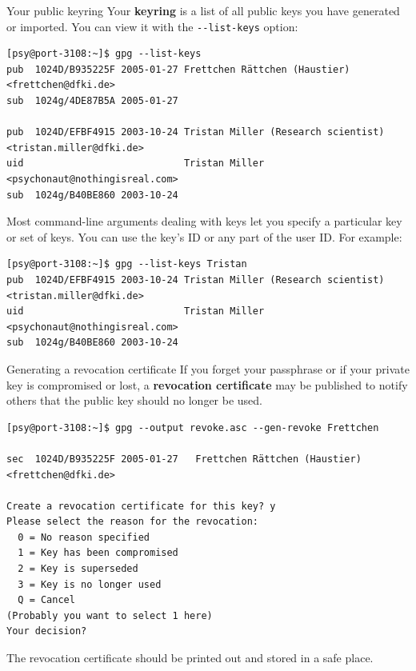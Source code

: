\documentclass[%
mode=present,%
paper=smartboard,
size=20pt,
]{powerdot}
\newcommand{\clopt}[1]{\texttt{{-}#1}}
\begin{document}
\makeatletter\renewcommand{\verbatim@font}{\tiny\tt}\makeatother
\begin{slide}[method=direct]{Your public keyring}
  Your \textbf{keyring} is a list of all public keys you have
  generated or imported.  You can view it with the
  \clopt{-list-keys} option:\\[1ex]
\begin{verbatim}
[psy@port-3108:~]$ gpg --list-keys
pub  1024D/B935225F 2005-01-27 Frettchen Rättchen (Haustier) <frettchen@dfki.de>
sub  1024g/4DE87B5A 2005-01-27

pub  1024D/EFBF4915 2003-10-24 Tristan Miller (Research scientist) <tristan.miller@dfki.de>
uid                            Tristan Miller <psychonaut@nothingisreal.com>
sub  1024g/B40BE860 2003-10-24

\end{verbatim}%
  Most command-line arguments dealing with keys let you specify a
  particular key or set of keys.  You can use the key's ID or any part
  of the user ID.  For example:\\[1ex]
\begin{verbatim}
[psy@port-3108:~]$ gpg --list-keys Tristan
pub  1024D/EFBF4915 2003-10-24 Tristan Miller (Research scientist) <tristan.miller@dfki.de>
uid                            Tristan Miller <psychonaut@nothingisreal.com>
sub  1024g/B40BE860 2003-10-24

\end{verbatim}%
\end{slide}

\makeatletter\renewcommand{\verbatim@font}{\tiny\tt}\makeatother
\begin{slide}[method=direct]{Generating a revocation certificate}
  If you forget your passphrase or if your private key is compromised
  or lost, a \textbf{revocation certificate} may be published to
  notify others that the public key should no longer be used.\\[1ex]
\begin{verbatim}
[psy@port-3108:~]$ gpg --output revoke.asc --gen-revoke Frettchen

sec  1024D/B935225F 2005-01-27   Frettchen Rättchen (Haustier) <frettchen@dfki.de>

Create a revocation certificate for this key? y
Please select the reason for the revocation:
  0 = No reason specified
  1 = Key has been compromised
  2 = Key is superseded
  3 = Key is no longer used
  Q = Cancel
(Probably you want to select 1 here)
Your decision?

\end{verbatim}%

The revocation certificate should be printed out and stored in a safe
place.
\end{slide}
\end{document}
